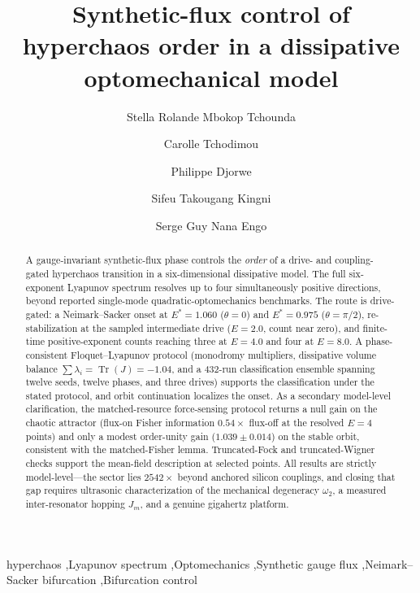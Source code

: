 \documentclass[preprint,numbers,a4paper]{elsarticle}
\begin{document}
\begin{frontmatter}

\title{Synthetic-flux control of hyperchaos order in a dissipative optomechanical model}

\author[inst1]{Stella Rolande Mbokop Tchounda}
\author[inst1]{Carolle Tchodimou}
\author[inst2]{Philippe Djorwe}
\author[inst3]{Sifeu Takougang Kingni}
\author[inst1,corref]{Serge Guy Nana Engo}



\begin{abstract}
A gauge-invariant synthetic-flux phase controls the \emph{order} of a drive- and coupling-gated hyperchaos transition in a six-dimensional dissipative model. The full six-exponent Lyapunov spectrum resolves up to four simultaneously positive directions, beyond reported single-mode quadratic-optomechanics benchmarks. The route is drive-gated: a Neimark--Sacker onset at $E^{*}=\num{1.060}$ ($\theta=0$) and $E^{*}=\num{0.975}$ ($\theta=\pi/2$), re-stabilization at the sampled intermediate drive ($E=\num{2.0}$, count near zero), and finite-time positive-exponent counts reaching three at $E=\num{4.0}$ and four at $E=\num{8.0}$. A phase-consistent Floquet--Lyapunov protocol (monodromy multipliers, dissipative volume balance $\sum\lambda_i=\operatorname{Tr}(J)=-1.04$, and a \num{432}-run classification ensemble spanning twelve seeds, twelve phases, and three drives) supports the classification under the stated protocol, and orbit continuation localizes the onset. As a secondary model-level clarification, the matched-resource force-sensing protocol returns a null gain on the chaotic attractor (flux-on Fisher information $\num{0.54}\times$ flux-off at the resolved $E=\num{4}$ points) and only a modest order-unity gain ($\num{1.039}\pm\num{0.014}$) on the stable orbit, consistent with the matched-Fisher lemma. Truncated-Fock and truncated-Wigner checks support the mean-field description at selected points. All results are strictly model-level---the sector lies $\num{2542}\times$ beyond anchored silicon couplings, and closing that gap requires ultrasonic characterization of the mechanical degeneracy $\omega_2$, a measured inter-resonator hopping $J_m$, and a genuine gigahertz platform.
\end{abstract}

\begin{keyword}
hyperchaos \sep Lyapunov spectrum \sep Optomechanics \sep Synthetic gauge flux \sep Neimark--Sacker bifurcation \sep Bifurcation control
\end{keyword}

\end{frontmatter}
\end{document}
